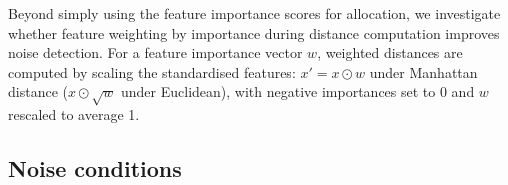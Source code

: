 Beyond simply using the feature importance scores for allocation, we investigate whether feature weighting by importance during distance computation improves noise detection. For a feature importance vector $w$, weighted distances are computed by scaling the standardised features: $x' = x \odot w$ under Manhattan distance ($x \odot \sqrt{w}$ under Euclidean), with negative importances set to 0 and $w$ rescaled to average 1. 


\subsection{Noise conditions}
